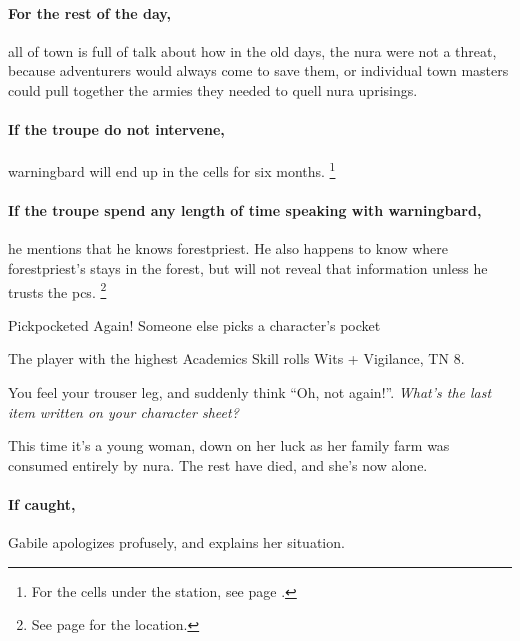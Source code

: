 \paragraph{For the rest of the day,}
all of \gls{town} is full of talk about how in the old days, the nura were not a threat, because adventurers would always come to save them, or individual town masters could pull together the armies they needed to quell nura uprisings.

\paragraph{If the troupe do not intervene,}
\gls{warningbard} will end up in the cells for six months.
\footnote{For the cells under the  station, see page \pageref{guardstation}.}

\warningbard

\paragraph{If the troupe spend any length of time speaking with \gls{warningbard},}
he mentions that he knows \gls{forestpriest}.
He also happens to know where \gls{forestpriest}'s stays in the forest, but will not reveal that information unless he trusts the \glspl{pc}.
\footnote{See page \pageref{lostcity} for the location.}

{Pickpocketed Again!}%
{Someone else picks a character's pocket}%

The player with the highest Academics Skill rolls Wits + Vigilance, TN 8.

\begin{boxtext}

  You feel your trouser leg, and suddenly think ``Oh, not again!''.  \textit{What's the last item written on your character sheet?}

\end{boxtext}

This time it's a young woman, down on her luck as her family farm was consumed entirely by nura.
The rest have died, and she's now alone.

\paragraph{If caught,}
Gabile apologizes profusely, and explains her situation.


